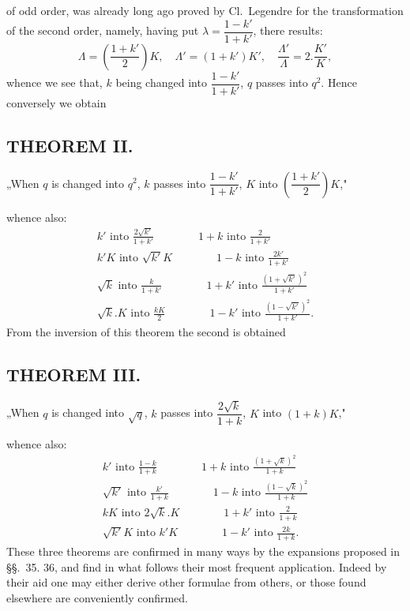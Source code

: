 \documentclass{article}
\begin{document}
of odd order, was already long ago proved by Cl.\ Legendre for the transformation of the second order, namely, having put $\lambda=\dfrac{1-k'}{1+k'}$, there results:
\[
\Lambda=\left(\frac{1+k'}{2}\right)K,\quad\Lambda'=(1+k')K',\quad\frac{\Lambda'}{\Lambda}=2.\frac{K'}{K},
\]
whence we see that, $k$ being changed into $\dfrac{1-k'}{1+k'}$, $q$ passes into $q^{2}$. Hence conversely we obtain

\subsection*{THEOREM II.}

„When $q$ is changed into $q^{2}$, $k$ passes into $\dfrac{1-k'}{1+k'}$, $K$ into $\left(\dfrac{1+k'}{2}\right)K$,"

whence also:
\[
\begin{gathered}
k'\text{ into }\frac{2\sqrt{k'}}{1+k'}\qquad\qquad 1+k\text{ into }\frac{2}{1+k'}
\\[2ex]
k'K\text{ into }\sqrt{k'}K\qquad\qquad 1-k\text{ into }\frac{2k'}{1+k'}
\\[2ex]
\sqrt{k}\text{ into }\frac{k}{1+k'}\qquad\qquad 1+k'\text{ into }\frac{(1+\sqrt{k'})^{2}}{1+k'}
\\[2ex]
\sqrt{k}.K\text{ into }\frac{kK}{2}\qquad\qquad 1-k'\text{ into }\frac{(1-\sqrt{k'})^{2}}{1+k'}.
\end{gathered}
\]
From the inversion of this theorem the second is obtained

\subsection*{THEOREM III.}

„When $q$ is changed into $\sqrt{q}$, $k$ passes into $\dfrac{2\sqrt{k}}{1+k}$, $K$ into $(1+k)K$,"

whence also:
\[
\begin{gathered}
k'\text{ into }\frac{1-k}{1+k}\qquad\qquad 1+k\text{ into }\frac{(1+\sqrt{k})^{2}}{1+k}
\\[2ex]
\sqrt{k'}\text{ into }\frac{k'}{1+k}\qquad\qquad 1-k\text{ into }\frac{(1-\sqrt{k})^{2}}{1+k}
\\[2ex]
kK\text{ into }2\sqrt{k}.K\qquad\qquad 1+k'\text{ into }\frac{2}{1+k}
\\[2ex]
\sqrt{k'}K\text{ into }k'K\qquad\qquad 1-k'\text{ into }\frac{2k}{1+k}.
\end{gathered}
\]
These three theorems are confirmed in many ways by the expansions proposed in §§.\ 35. 36, and find in what follows their most frequent application. Indeed by their aid one may either derive other formulae from others, or those found elsewhere are conveniently confirmed.
\end{document}
